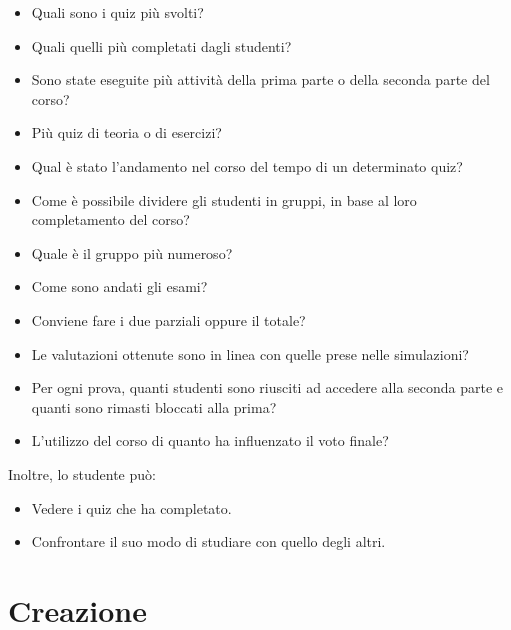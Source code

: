 \begin{itemize}

\item Quali sono i quiz più svolti? 
\item Quali quelli più completati dagli studenti?
\item Sono state eseguite più attività della prima parte o della seconda parte del corso?
\item Più quiz di teoria o di esercizi?
\item Qual è stato l'andamento nel corso del tempo di un determinato quiz?
   
\end{itemize}

\begin{itemize}

   \item Come è possibile dividere gli studenti in gruppi, in base al loro completamento del corso? 
   \item Quale è il gruppo più numeroso?
    
\end{itemize}

\begin{itemize}

\item Come sono andati gli esami?
\item Conviene fare i due parziali oppure il totale?
\item Le valutazioni ottenute sono in linea con quelle prese nelle simulazioni?
\item Per ogni prova, quanti studenti sono riusciti ad accedere alla seconda parte e quanti sono rimasti bloccati alla prima?
\item L'utilizzo del corso di quanto ha influenzato il voto finale?

\end{itemize}

Inoltre, lo studente può:

\begin{itemize}

\item Vedere i quiz che ha completato.
\item Confrontare il suo modo di studiare con quello degli altri.

\end{itemize}

\clearpage

\section{Creazione}

